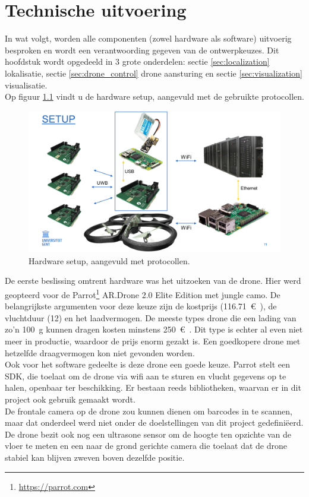 \chapter{Technische uitvoering}
In wat volgt, worden alle componenten (zowel hardware als software) uitvoerig besproken en wordt een verantwoording gegeven van de ontwerpkeuzes.
Dit hoofdstuk wordt opgedeeld in 3 grote onderdelen: sectie \ref{sec:localization} lokalisatie, sectie \ref{sec:drone_control} drone aansturing en sectie \ref{sec:visualization} visualisatie.\\

Op figuur \ref{fig:setup} vindt u de hardware setup, aangevuld met de gebruikte protocollen.\\
\begin{figure}[p]
	\centering
	\includegraphics[width=\textwidth]{Setup}
	\caption[Setup]{Hardware setup, aangevuld met protocollen.}
	\label{fig:setup}
\end{figure}

De eerste beslissing omtrent hardware was het uitzoeken van de drone.
Hier werd geopteerd voor de Parrot\footnote{\url{https://parrot.com}} AR.Drone 2.0 Elite Edition met jungle camo.
De belangrijkste argumenten voor deze keuze zijn de kostprijs (\SI{116.71}{\euro{}}), de vluchtduur (\SI{12}{\min}) en het laadvermogen. De meeste types drone die een lading van zo'n \SI{100}{\g} kunnen dragen kosten minstens \SI{250}{\euro{}}. Dit type is echter al even niet meer in productie, waardoor de prijs enorm gezakt is. Een goedkopere drone met hetzelfde draagvermogen kon niet gevonden worden.\\
Ook voor het software gedeelte is deze drone een goede keuze. Parrot stelt een SDK, die toelaat om de drone via wifi aan te sturen en vlucht gegevens op te halen, openbaar ter beschikking.
Er bestaan reeds bibliotheken, waarvan er in dit project ook gebruik gemaakt wordt.\\
De frontale camera op de drone zou kunnen dienen om barcodes in te scannen, maar dat onderdeel werd niet onder de doelstellingen van dit project gedefini\"eerd. De drone bezit ook nog een ultrasone sensor om de hoogte ten opzichte van de vloer te meten en een naar de grond gerichte camera die toelaat dat de drone stabiel kan blijven zweven boven dezelfde positie.\\

